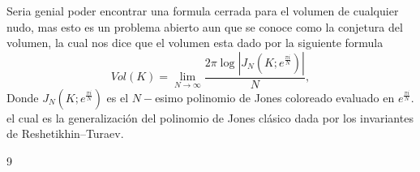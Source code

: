 \documentclass[12pt]{article}
\begin{document}
    Seria genial poder encontrar una formula cerrada para el volumen de cualquier nudo, mas esto es un problema abierto aun que se conoce como la conjetura del volumen, la cual nos dice que el volumen esta dado por la siguiente formula
    $$Vol(K)=\lim_{N\to\infty}\frac{2\pi\log|J_N(K;e^{\frac{\pi i}{N}})|}{N},$$
    Donde $J_N(K;e^{\frac{\pi i}{N}})$ es el $N-$esimo polinomio de Jones coloreado evaluado en $e^{\frac{\pi i}{N}}$. el cual es la generalización del polinomio de Jones clásico dada por los invariantes de Reshetikhin–Turaev.
\begin{thebibliography}{9}



\end{thebibliography}
\end{document}
